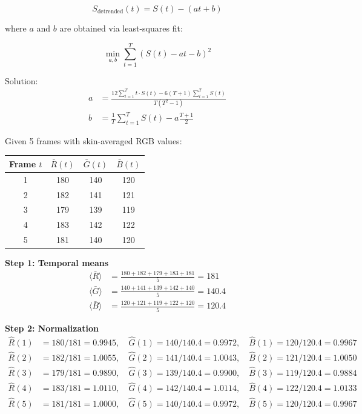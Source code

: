 \documentclass[11pt,a4paper]{article}
\begin{document}
\begin{equation}
S_{\text{detrended}}(t) = S(t) - (at + b)
\end{equation}

where $a$ and $b$ are obtained via least-squares fit:

\begin{equation}
\min_{a,b} \sum_{t=1}^{T} (S(t) - at - b)^2
\end{equation}

Solution:
\begin{align}
a &= \frac{12 \sum_{t=1}^{T} t \cdot S(t) - 6(T+1) \sum_{t=1}^{T} S(t)}{T(T^2 - 1)} \\
b &= \frac{1}{T} \sum_{t=1}^{T} S(t) - a \frac{T+1}{2}
\end{align}

\begin{tcolorbox}[colback=red!5!white,colframe=red!75!black,title=Complete CHROM Example]
Given 5 frames with skin-averaged RGB values:

\begin{center}
\begin{tabular}{c|ccc}
Frame $t$ & $\bar{R}(t)$ & $\bar{G}(t)$ & $\bar{B}(t)$ \\
\hline
1 & 180 & 140 & 120 \\
2 & 182 & 141 & 121 \\
3 & 179 & 139 & 119 \\
4 & 183 & 142 & 122 \\
5 & 181 & 140 & 120 \\
\end{tabular}
\end{center}

\textbf{Step 1: Temporal means}
\begin{align*}
\langle \bar{R} \rangle &= \frac{180 + 182 + 179 + 183 + 181}{5} = 181 \\
\langle \bar{G} \rangle &= \frac{140 + 141 + 139 + 142 + 140}{5} = 140.4 \\
\langle \bar{B} \rangle &= \frac{120 + 121 + 119 + 122 + 120}{5} = 120.4
\end{align*}

\textbf{Step 2: Normalization}
\begin{align*}
\hat{R}(1) &= 180/181 = 0.9945, \quad \hat{G}(1) = 140/140.4 = 0.9972, \quad \hat{B}(1) = 120/120.4 = 0.9967 \\
\hat{R}(2) &= 182/181 = 1.0055, \quad \hat{G}(2) = 141/140.4 = 1.0043, \quad \hat{B}(2) = 121/120.4 = 1.0050 \\
\hat{R}(3) &= 179/181 = 0.9890, \quad \hat{G}(3) = 139/140.4 = 0.9900, \quad \hat{B}(3) = 119/120.4 = 0.9884 \\
\hat{R}(4) &= 183/181 = 1.0110, \quad \hat{G}(4) = 142/140.4 = 1.0114, \quad \hat{B}(4) = 122/120.4 = 1.0133 \\
\hat{R}(5) &= 181/181 = 1.0000, \quad \hat{G}(5) = 140/140.4 = 0.9972, \quad \hat{B}(5) = 120/120.4 = 0.9967
\end{align*}


\end{tcolorbox}
\end{document}
